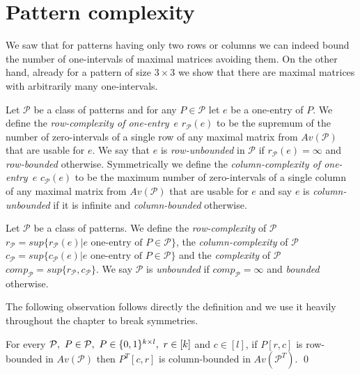 \section{Pattern complexity}
We saw that for patterns having only two rows or columns we can indeed bound the number of one-intervals of maximal matrices avoiding them. On the other hand, already for a pattern of size $3\times3$ we show that there are maximal matrices with arbitrarily many one-intervals.

\begin{defn}
Let $\mathcal{P}$ be a class of patterns and for any $P\in\mathcal{P}$ let $e$ be a one-entry of $P$. We define the \emph{row-complexity of one-entry}~$e$ $r_\mathcal{P}(e)$ to be the supremum of the number of zero-intervals of a single row of any maximal matrix from $Av(\mathcal{P})$ that are usable for $e$. We say that $e$ is \emph{row-unbounded} in $\mathcal{P}$ if $r_\mathcal{P}(e)=\infty$ and \emph{row-bounded} otherwise. Symmetrically we define the \emph{column-complexity of one-entry}~$e$ $c_\mathcal{P}(e)$ to be the maximum number of zero-intervals of a single column of any maximal matrix from $Av(\mathcal{P})$ that are usable for $e$ and say $e$ is \emph{column-unbounded} if it is infinite and \emph{column-bounded} otherwise.
\end{defn}

\begin{defn}
Let $\mathcal{P}$ be a class of patterns. We define the \emph{row-complexity} of $\mathcal{P}$~$r_\mathcal{P}=sup\{r_\mathcal{P}(e)|e \text{ one-entry of } P\in\mathcal{P}\}$, the \emph{column-complexity} of $\mathcal{P}$~$c_\mathcal{P}=sup\{c_\mathcal{P}(e)|e \text{ one-entry of } P\in\mathcal{P}\}$ and the \emph{complexity} of $\mathcal{P}$~$comp_\mathcal{P}=sup\{r_\mathcal{P},c_\mathcal{P}\}$. We say $\mathcal{P}$ is \emph{unbounded} if $comp_\mathcal{P}=\infty$ and \emph{bounded} otherwise.
\end{defn}

The following observation follows directly the definition and we use it heavily throughout the chapter to break symmetries.

\begin{obs}
\label{obs:transposebounded}
For every $\mathcal{P},\ P\in\mathcal{P},\ P\in\Pat,\ r\in[k]$ and $c\in[l]$, if $P[r,c]$ is row-bounded in $Av(\mathcal{P})$ then $P^T[c,r]$ is column-bounded in $Av(\mathcal{P}^T)$. \qed
\end{obs}

